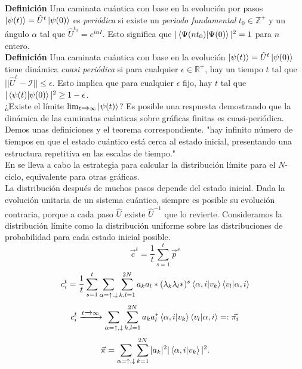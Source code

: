 \noindent\textbf{Definición} Una caminata cuántica con base en la evolución por pasos $\ket{\psi(t)}=\hat{U}^t\ket{\psi(0)}$ es \textit{periódica} si existe un \textit{periodo fundamental} $t_0\in\mathbb{Z}^+$ y un ángulo $\alpha$ tal que $\hat{U}^{t_0}=e^{i\alpha I}$. Esto significa que $|\braket{\Psi(nt_0)|\Psi(0)}|^2=1$ para $n$ entero.\\

\noindent\textbf{Definición} Una caminata cuántica con base en la evolución $\ket{\psi(t)}=\hat{U}^t\ket{\psi(0)}$ tiene dinámica \textit{cuasi periódica} si para cualquier $\epsilon\in\mathbb{R}^+$, hay un tiempo $t$ tal que $||\hat{U}^t-\mathcal{I}||\leq\epsilon$.
Esto implica que para cualquier $\epsilon$ fijo, hay $t$ tal que $|\braket{\psi(t)|\psi(0)}|^2\geq1-\epsilon$.\\

¿Existe el límite $\lim_{t\xrightarrow{}\infty}\ket{\psi(t)}$? Es posible una respuesta demostrando que la dinámica de las caminatas cuánticas sobre gráficas finitas es cuasi-periódica. Demos unas definiciones y el teorema correspondiente. "hay infinito número de tiempos en que el estado cuántico está cerca al estado inicial, presentando una estructura repetitiva en las escalas de tiempo."\\

En \cite{aharonov2001quantum} se lleva a cabo la estrategia para calcular la distribución límite para el $N$-
ciclo, equivalente para otras gráficas.\\

La distribución después de muchos pasos depende del estado inicial. Dada la evolución unitaria de un sistema cuántico, siempre es posible su evolución contraria, porque a cada paso $\hat{U}$ existe $\hat{U}^{-1}$ que lo revierte. Consideramos la distribución límite como la distribución uniforme sobre las distribuciones de probabilidad para cada estado inicial posible.\\

\begin{equation}
    \Vec{c}^t=\frac{1}{t}\sum_{s=1}^t\Vec{p}^s
\end{equation}{}
\begin{equation}
c_i^t=\dfrac{1}{t}\sum_{s=1}^t\sum_{\alpha=\uparrow.\downarrow}\sum_{k,l=1}^{2N}a_ka_l*(\lambda_k\lambda_l*)^s\braket{\alpha,i|v_k}\braket{v_l|\alpha,i}
\end{equation}{}
\begin{equation}
    c_i^t\xrightarrow{t\xrightarrow{}\infty}\sum_{\alpha=\uparrow,\downarrow}\sum_{k,l=1}^{2N}a_ka_l^*\braket{\alpha,i|v_k}\braket{v_l|\alpha,i}=:\Vec{\pi_i}
\end{equation}{}
\begin{equation}
    \Vec{\pi}=\sum_{\alpha=\uparrow,\downarrow}\sum_{k=1}^{2N}|a_k|^2|\braket{\alpha,i|v_k}|^2.
\end{equation}{}

